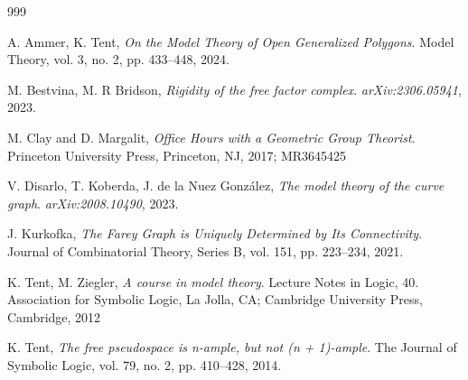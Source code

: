 \documentclass[10pt,a4paper]{amsart}
\begin{document}
\begin{thebibliography}{999}

 
  A. Ammer, K. Tent, \emph{On the Model Theory of Open Generalized Polygons}. Model Theory, vol. 3, no. 2, pp. 433--448, 2024. 


 M. Bestvina, M. R Bridson, \emph{Rigidity of the free factor complex}. \textit{arXiv:2306.05941}, 2023. 

 M. Clay and D. Margalit, \emph{Office Hours with a Geometric Group Theorist}. Princeton University Press, Princeton, NJ, 2017; MR3645425


 V. Disarlo, T. Koberda, J. de la Nuez González, \emph{The model theory of the curve graph}. \textit{arXiv:2008.10490}, 2023.

J. Kurkofka, 
\emph{The Farey Graph is Uniquely Determined by Its Connectivity}. 
Journal of Combinatorial Theory, Series B, 
vol. 151, pp. 223–234, 2021. 

 K. Tent, M. Ziegler, \emph{A course in model theory}. Lecture Notes in Logic, 40. Association for Symbolic Logic, La Jolla, CA; Cambridge University Press, Cambridge, 2012
		
 K. Tent, \emph{The free pseudospace is n-ample, but not (n + 1)-ample}. The Journal of Symbolic Logic, 
vol. 79, no. 2, pp. 410–428, 2014. 

\end{thebibliography}
\end{document}
